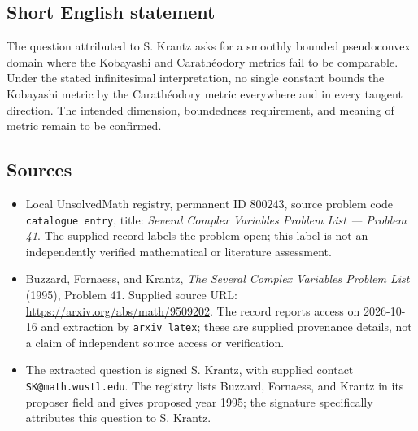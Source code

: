\documentclass[11pt]{article}
\begin{document}
\subsection{Short English statement}
The question attributed to S. Krantz asks for a smoothly bounded pseudoconvex domain where the Kobayashi and Carath\'eodory metrics fail to be comparable. Under the stated infinitesimal interpretation, no single constant bounds the Kobayashi metric by the Carath\'eodory metric everywhere and in every tangent direction. The intended dimension, boundedness requirement, and meaning of metric remain to be confirmed.
\subsection{Sources}
\begin{itemize}
\item Local UnsolvedMath registry, permanent ID \(800243\), source problem code \texttt{catalogue entry}, title: \emph{Several Complex Variables Problem List --- Problem 41}. The supplied record labels the problem open; this label is not an independently verified mathematical or literature assessment.
\item Buzzard, Fornaess, and Krantz, \emph{The Several Complex Variables Problem List} (1995), Problem 41. Supplied source URL: \url{https://arxiv.org/abs/math/9509202}. The record reports access on 2026-10-16 and extraction by \texttt{arxiv\_latex}; these are supplied provenance details, not a claim of independent source access or verification.
\item The extracted question is signed S. Krantz, with supplied contact \texttt{SK@math.wustl.edu}. The registry lists Buzzard, Fornaess, and Krantz in its proposer field and gives proposed year 1995; the signature specifically attributes this question to S. Krantz.
\end{itemize}
\end{document}
